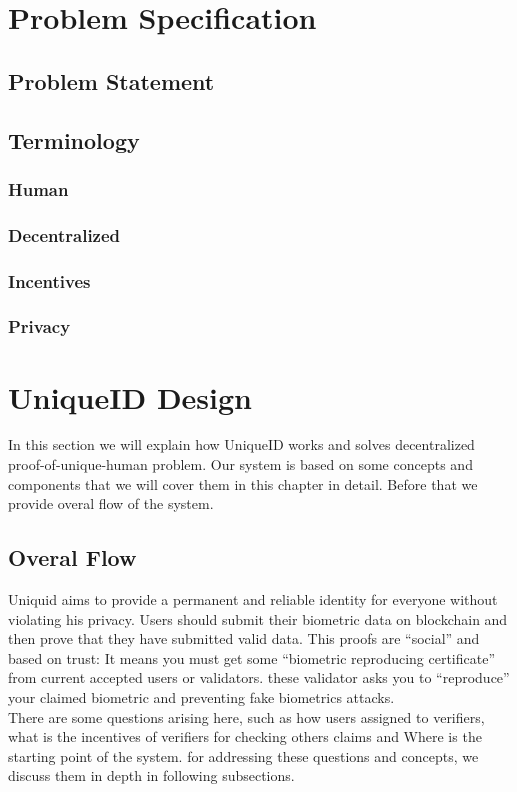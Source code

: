 \documentclass{article}
\begin{document}
\section{ Problem Specification}

\subsection{Problem Statement}

\subsection{Terminology}
\subsubsection{Human}
\subsubsection{Decentralized}
\subsubsection{Incentives}
\subsubsection{Privacy}



\section{ UniqueID Design}
In this section we will explain how UniqueID works and solves decentralized proof-of-unique-human problem. Our system is based on some concepts and components that we will cover them in this chapter in detail. Before that we provide overal flow of the system.

\subsection{Overal Flow}

  Uniquid aims to provide a permanent and reliable identity for everyone without violating his privacy.  Users should submit their biometric data on blockchain and then prove that they have submitted valid data. This proofs are “social” and based on trust: It means you must get some “biometric reproducing certificate” from current accepted users or validators. these validator asks you to “reproduce” your claimed biometric and preventing fake biometrics attacks.
  \\
  There are some questions arising here, such as how users assigned to verifiers, what is the incentives of verifiers for checking others claims and Where is the starting point of the system. for addressing these questions and concepts, we discuss them in depth in following subsections.
\end{document}
